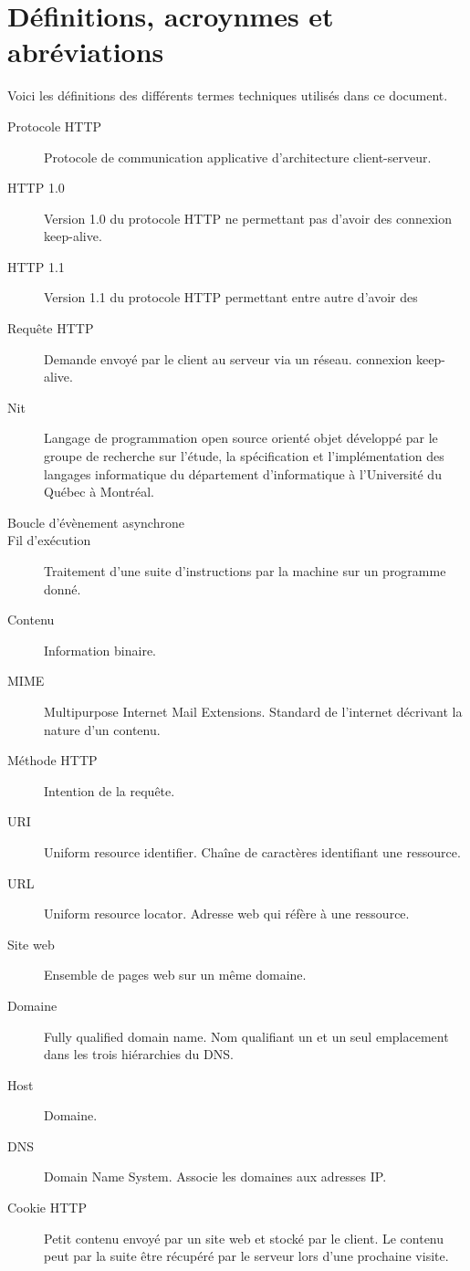\documentclass{scrreprt}
\begin{document}
\section{Définitions, acroynmes et abréviations}
Voici les définitions des différents termes techniques utilisés dans ce
document.
\begin{description}
\item[Protocole HTTP] Protocole de communication applicative d'architecture
client-serveur\cite{http}.
\item[HTTP 1.0] Version 1.0 du protocole HTTP ne permettant pas d'avoir des
connexion keep-alive.
\item[HTTP 1.1] Version 1.1 du protocole HTTP permettant entre autre d'avoir des
\item[Requête HTTP] Demande envoyé par le client au serveur via un réseau.
connexion keep-alive\cite{http1.0}.
\item[Nit] Langage de programmation open source orienté objet développé par le
groupe de recherche sur l'étude, la spécification et l'implémentation des
langages informatique du département d'informatique à l'Université du Québec à
Montréal.
    \item[Boucle d'évènement asynchrone]
    \item[Fil d'exécution] Traitement d'une suite d'instructions par la machine sur un programme donné.
    \item[Contenu] Information binaire.
    \item[MIME] Multipurpose Internet Mail Extensions. Standard de l'internet décrivant la nature d'un contenu.
    \item[Méthode HTTP] Intention de la requête.
    \item[URI] Uniform resource identifier. Chaîne de caractères identifiant une ressource.
    \item[URL] Uniform resource locator. Adresse web qui réfère à une ressource.
    \item[Site web] Ensemble de pages web sur un même domaine.
    \item[Domaine] Fully qualified domain name. Nom qualifiant un et un seul emplacement dans les trois hiérarchies du DNS.
    \item[Host] Domaine.
    \item[DNS] Domain Name System. Associe les domaines aux adresses IP.
    \item[Cookie HTTP] Petit contenu envoyé par un site web et stocké par le client. Le contenu peut par la suite être récupéré par le serveur lors d'une prochaine visite.

\end{description}
\end{document}
